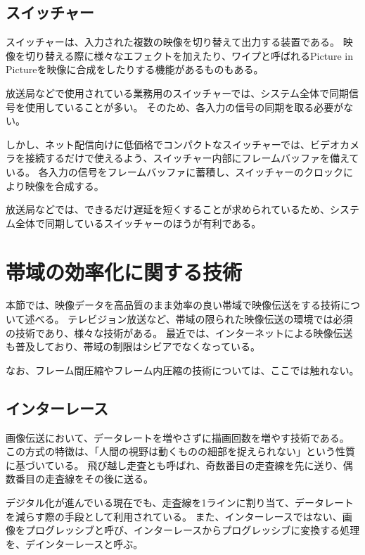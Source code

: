 \subsection{スイッチャー}
\label{src:switcher}

スイッチャーは、入力された複数の映像を切り替えて出力する装置である。
映像を切り替える際に様々なエフェクトを加えたり、ワイプと呼ばれるPicture in Pictureを映像に合成をしたりする機能があるものもある。

放送局などで使用されている業務用のスイッチャーでは、システム全体で同期信号を使用していることが多い。
そのため、各入力の信号の同期を取る必要がない。

しかし、ネット配信向けに低価格でコンパクトなスイッチャーでは、ビデオカメラを接続するだけで使えるよう、スイッチャー内部にフレームバッファを備えている。
各入力の信号をフレームバッファに蓄積し、スイッチャーのクロックにより映像を合成する。

放送局などでは、できるだけ遅延を短くすることが求められているため、システム全体で同期しているスイッチャーのほうが有利である。

\section{帯域の効率化に関する技術}
本節では、映像データを高品質のまま効率の良い帯域で映像伝送をする技術について述べる。
テレビジョン放送など、帯域の限られた映像伝送の環境では必須の技術であり、様々な技術がある。
最近では、インターネットによる映像伝送も普及しており、帯域の制限はシビアでなくなっている。

なお、フレーム間圧縮やフレーム内圧縮の技術については、ここでは触れない。

\subsection{インターレース}
\label{sec:interlace}

画像伝送において、データレートを増やさずに描画回数を増やす技術である。
この方式の特徴は、「人間の視野は動くものの細部を捉えられない」という性質に基づいている。
飛び越し走査とも呼ばれ、奇数番目の走査線を先に送り、偶数番目の走査線をその後に送る。

デジタル化が進んでいる現在でも、走査線を1ラインに割り当て、データレートを減らす際の手段として利用されている。
また、インターレースではない、画像をプログレッシブと呼び、インターレースからプログレッシブに変換する処理を、デインターレースと呼ぶ。

